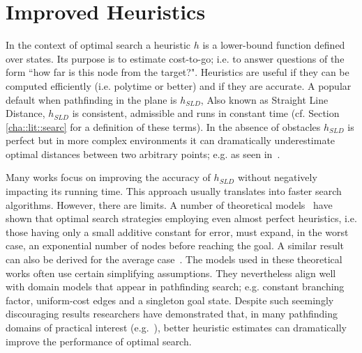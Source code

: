\section{Improved Heuristics}
\label{cha::lit::heuristics}

%
In the context of optimal search a heuristic $h$ is a lower-bound function defined over states. Its
purpose is to estimate cost-to-go; i.e. to answer questions of the form ``how far is this node from
the target?".  Heuristics are useful if they can be computed efficiently (i.e.  polytime or better)
and if they are accurate.  A popular default when pathfinding in the plane is $h_{SLD}$, Also known
as Straight Line Distance, $h_{SLD}$ is consistent, admissible and runs in constant time (cf.
Section \ref{cha::lit::searc} for a definition of these terms).  In the absence of obstacles
$h_{SLD}$ is perfect but in more complex environments it can dramatically underestimate optimal
distances between two arbitrary points; e.g. as seen in~\citep{goldberg05}.

Many works focus on improving the accuracy of $h_{SLD}$ without negatively impacting its running
time. This approach usually translates into faster search algorithms. However, there are limits.  A
number of theoretical models~\citep{pohl77,helmert08} have shown that optimal search strategies
employing even almost perfect heuristics, i.e. those having only a small additive constant for
error, must expand, in the worst case, an exponential number of nodes before reaching the goal.  A
similar result can also be derived for the average case~\citep{pearl84}.  The models used in these
theoretical works often use certain simplifying assumptions.  They nevertheless align well with
domain models that appear in pathfinding search; e.g. constant branching factor, uniform-cost edges
and a singleton goal state.  Despite such seemingly discouraging results researchers have
demonstrated that, in many pathfinding domains of practical interest (e.g.~\citep{sturtevant12}),
better heuristic estimates can dramatically improve the performance of optimal search.


